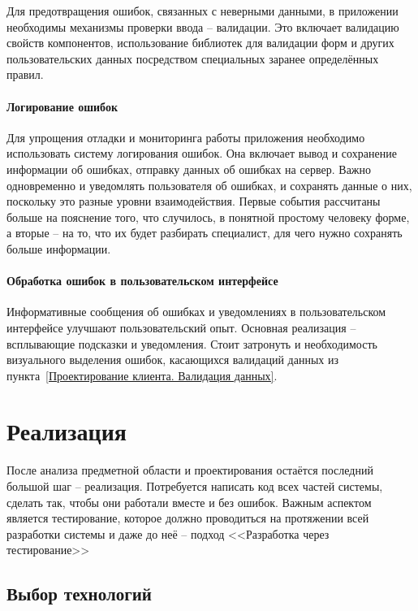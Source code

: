 \documentclass[a4paper,article]{article}
\begin{document}
\begin{sloppypar}
    Для предотвращения ошибок, связанных с неверными данными, в приложении необходимы механизмы проверки ввода -- валидации. Это включает валидацию свойств компонентов, использование библиотек для валидации форм и других пользовательских данных посредством специальных заранее определённых правил.

    \paragraph{Логирование ошибок}

    Для упрощения отладки и мониторинга работы приложения необходимо использовать систему логирования ошибок. Она включает вывод и сохранение информации об ошибках, отправку данных об ошибках на сервер. Важно одновременно и уведомлять пользователя об ошибках, и сохранять данные о них, поскольку это разные уровни взаимодействия. Первые события рассчитаны больше на пояснение того, что случилось, в понятной простому человеку форме, а вторые -- на то, что их будет разбирать специалист, для чего нужно сохранять больше информации.

    \paragraph{Обработка ошибок в пользовательском интерфейсе}

    Информативные сообщения об ошибках и уведомлениях в пользовательском интерфейсе улучшают пользовательский опыт. Основная реализация -- всплывающие подсказки и уведомления. Стоит затронуть и необходимость визуального выделения ошибок, касающихся валидаций данных из пункта~\ref{Проектирование клиента. Валидация данных}.

    \newpage

    \section{Реализация}\label{Реализация}

    После анализа предметной области и проектирования остаётся последний большой шаг -- реализация. Потребуется написать код всех частей системы, сделать так, чтобы они работали вместе и без ошибок. Важным аспектом является тестирование, которое должно проводиться на протяжении всей разработки системы и даже до неё -- подход <<Разработка через тестирование>>

    \subsection{Выбор технологий}\label{Реализация. Выбор}


\end{sloppypar}
\end{document}
